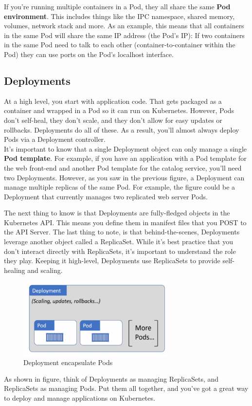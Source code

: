 \documentclass[10pt,a4paper]{report}
\begin{document}
If you’re running multiple containers in a Pod, they all share the same \textbf{Pod environment}. This includes things like the IPC namespace, shared memory, volumes, network stack and more. As an example, this means that all containers in the same Pod will share the same IP address (the Pod’s IP): If two containers in the same Pod need to talk to each other (container-to-container within the Pod) they can use ports on the Pod’s localhost interface.


\subsection{Deployments}
At a high level, you start with application code. That gets packaged as a container and wrapped in a Pod so it can run on Kubernetes. However, Pods don’t self-heal, they don’t scale, and they don’t allow for easy updates or rollbacks. Deployments do all of these. As a result, you’ll almost always deploy Pods via a Deployment controller.\\
It’s important to know that a single Deployment object can only manage a single \textbf{Pod template}. For example, if you have an application with a Pod template for the web front-end and another Pod template for the catalog service, you’ll need two Deployments. However, as you saw in the previous figure, a Deployment can manage multiple replicas of the same Pod. For example, the figure could be a Deployment that currently manages two replicated web server Pods.

The next thing to know is that Deployments are fully-fledged objects in the Kubernetes API. This means you define them in manifest files that you POST to the API Server. The last thing to note, is that behind-the-scenes, Deployments leverage another object called a ReplicaSet. While it’s best practice that you don’t interact directly with ReplicaSets, it’s important to understand the role they play. Keeping it high-level, Deployments use ReplicaSets to provide self-healing and scaling. 
\begin{figure}[h]
	\centering
	\includegraphics[width=0.7\textwidth]{image-deployment-manage}
	\caption{Deployment encapsulate Pods}
	\label{k8s-deployment-manage-pods}
\end{figure} 
As shown in figure, think of Deployments as managing ReplicaSets, and ReplicaSets as managing Pods. Put them all together, and you’ve got a great way to deploy and manage applications on Kubernetes.
\end{document}
